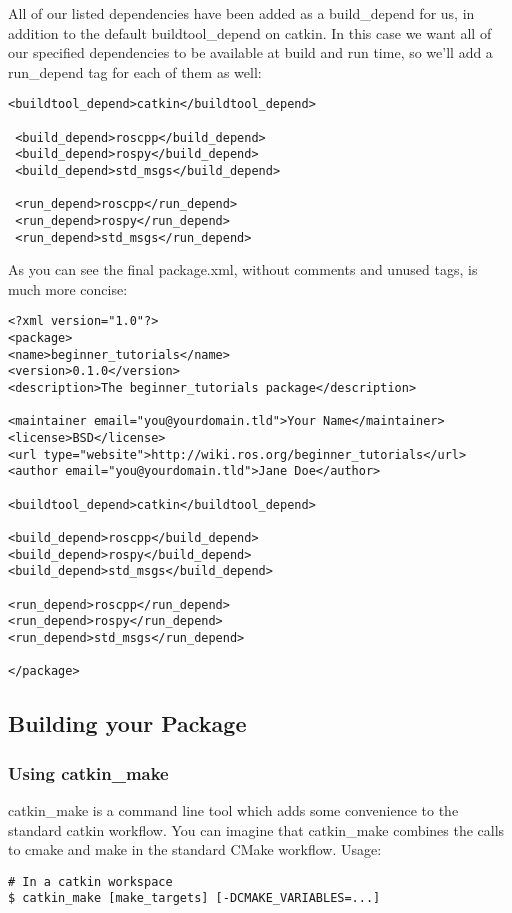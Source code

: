 All of our listed dependencies have been added as a build\_depend for us, in addition to the default buildtool\_depend on catkin. In this case we want all of our specified dependencies to be available at build and run time, so we'll add a run\_depend tag for each of them as well:

\begin{lstlisting}[breaklines=true languages=xml]
 <buildtool_depend>catkin</buildtool_depend>
 
 <build_depend>roscpp</build_depend>
 <build_depend>rospy</build_depend>
 <build_depend>std_msgs</build_depend>
 
 <run_depend>roscpp</run_depend>
 <run_depend>rospy</run_depend>
 <run_depend>std_msgs</run_depend>
\end{lstlisting}
\pagebreak
As you can see the final package.xml, without comments and unused tags, is much more concise:


\begin{lstlisting}[breaklines=true languages=xml]
<?xml version="1.0"?>
<package>
<name>beginner_tutorials</name>
<version>0.1.0</version>
<description>The beginner_tutorials package</description>

<maintainer email="you@yourdomain.tld">Your Name</maintainer>
<license>BSD</license>
<url type="website">http://wiki.ros.org/beginner_tutorials</url>
<author email="you@yourdomain.tld">Jane Doe</author>

<buildtool_depend>catkin</buildtool_depend>

<build_depend>roscpp</build_depend>
<build_depend>rospy</build_depend>
<build_depend>std_msgs</build_depend>

<run_depend>roscpp</run_depend>
<run_depend>rospy</run_depend>
<run_depend>std_msgs</run_depend>

</package>
\end{lstlisting}
\pagebreak
\newpage

\subsection{Building your Package}
\subsubsection{Using catkin\_make}
catkin\_make is a command line tool which adds some convenience to the standard catkin workflow. You can imagine that catkin\_make combines the calls to cmake and make in the standard CMake workflow.
\newline
\newline
Usage:
\begin{lstlisting}[breaklines=true languages=bash]
# In a catkin workspace
$ catkin_make [make_targets] [-DCMAKE_VARIABLES=...]
\end{lstlisting}

